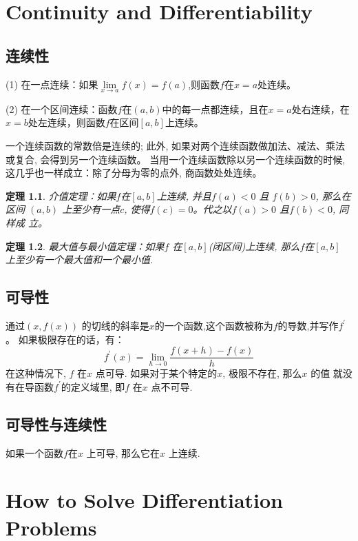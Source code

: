 \documentclass[11pt, b5paper, oneside]{book}
\newtheorem{theorem}{定理}[section]
\begin{document}
\chapter{Continuity and Differentiability}

\section{连续性}

(1) 在一点连续：如果$\lim\limits_{x\to a}f(x) = f(a)$,则函数$f$在$x=a$处连续。

(2) 在一个区间连续：函数$f$在$(a,b)$中的每一点都连续，且在$x=a$处右连续，在$x=b$处左连续，则函数$f$在区间$[a,b]$上连续。

一个连续函数的常数倍是连续的; 
此外, 如果对两个连续函数做加法、减法、乘法或复合, 
会得到另一个连续函数。
当用一个连续函数除以另一个连续函数的时候, 
这几乎也一样成立：除了分母为零的点外, 商函数处处连续。

\begin{theorem}
    \emph{介值定理：}如果$f$在$[a,b]$上连续, 并且$f(a) < 0$ 且 $f(b) > 0$, 那么在区间
    $(a,b)$ 上至少有一点$c$, 使得$f(c) = 0$。代之以$f(a) > 0$ 且$f(b) < 0$, 同样成
    立。
\end{theorem}

\begin{theorem}
    \emph{最大值与最小值定理：}如果$f$ 在$[a, b]$(闭区间)上连续, 
    那么$f$在$[a, b]$ 上至少有一个最大值和一个最小值.
\end{theorem}

\section{可导性}

通过$(x, f(x))$ 的切线的斜率是$x$的一个函数,这个函数被称为$f$的导数,并写作$f^{'}$。
如果极限存在的话，有：
\[f^{'}(x)=\lim\limits_{h\to 0}\frac{f(x+h)-f(x)}{h}\]
在这种情况下, $f$ 在$x$ 点可导. 如果对于某个特定的$x$, 极限不存在, 那么$x$ 的值
就没有在导函数$f^{'}$的定义域里, 即$f$ 在$x$ 点不可导.

\section{可导性与连续性}

如果一个函数$f$在$x$ 上可导, 那么它在$x$ 上连续.

\chapter{How to Solve Differentiation Problems}
\end{document}
